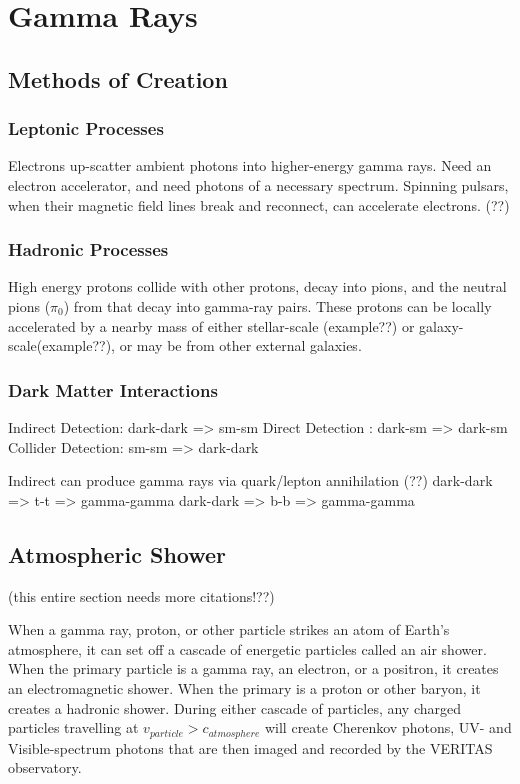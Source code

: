 \cleartooddpage[\thispagestyle{empty}]
\chapter{Gamma Rays}


\section{Methods of Creation}

\subsection{Leptonic Processes}
Electrons up-scatter ambient photons into higher-energy gamma rays.
Need an electron accelerator, and need photons of a necessary spectrum.
Spinning pulsars, when their magnetic field lines break and reconnect, can accelerate electrons. (??)

\subsection{Hadronic Processes}
High energy protons collide with other protons, decay into pions, and the neutral pions ($\pi_{0}$) from that decay into gamma-ray pairs.
These protons can be locally accelerated by a nearby mass of either stellar-scale (example??) or galaxy-scale(example??), or may be from other external galaxies.

\subsection{Dark Matter Interactions}
Indirect Detection: dark-dark => sm-sm
Direct Detection  : dark-sm => dark-sm
Collider Detection: sm-sm => dark-dark

Indirect can produce gamma rays via quark/lepton annihilation (??)
dark-dark => t-t => gamma-gamma
dark-dark => b-b => gamma-gamma


\section{Atmospheric Shower}
(this entire section needs more citations!??)

When a gamma ray, proton, or other particle strikes an atom of Earth's atmosphere, it can set off a cascade of energetic particles called an air shower.
When the primary particle is a gamma ray, an electron, or a positron, it creates an electromagnetic shower.
When the primary is a proton or other baryon, it creates a hadronic shower.
During either cascade of particles, any charged particles travelling at $v_{particle} > c_{atmosphere}$ will create Cherenkov photons, UV- and Visible-spectrum photons that are then imaged and recorded by the VERITAS observatory.

